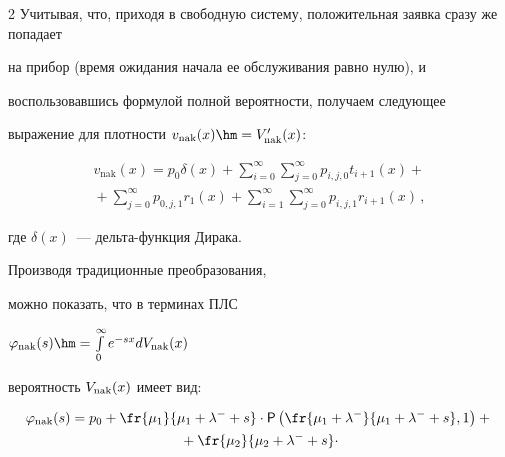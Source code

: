 \begin{multicols}{2}
Учитывая, что, приходя в свободную систему, положительная заявка сразу же попадает


на прибор (время ожидания начала ее обслуживания равно нулю), и


воспользовавшись формулой полной вероятности, получаем следующее


выражение для плот\-ности $v_{\mathrm{nak}}(x)\hm=V'_{\mathrm{nak}}(x)$:




\begin{multline*}


v_{\mathrm{nak}}(x) = p_0 \delta(x)


+ \sum\limits_{i=0}^{\infty} \sum\limits_{j=0}^{\infty}


p_{i,j,0} t_{i+1}(x) +{}\\


{}+ \sum\limits_{j=0}^{\infty}


p_{0,j,1} r_1(x) + \sum\limits_{i=1}^{\infty}


\sum\limits_{j=0}^{\infty} p_{i,j,1} r_{i+1}(x)\,,


\end{multline*}




где $\delta(x)$~--- дель\-та-функ\-ция Дирака.





Производя традиционные преобразования,


можно показать, что в терминах ПЛС


$\varphi_{\mathrm{nak}}(s)\hm=


\int\limits_0^{\infty} e^{-sx} dV_{\mathrm{nak}}(x)$


вероятность $V_{\rm nak}(x)$ имеет вид:




\begin{multline*}


\varphi_{\mathrm{nak}}(s)


= p_0 + \fr{ \mu_1}{\mu_1+\lambda^- + s}


\cdot {\sf P} \left (


\fr{ \mu_1 + \lambda^-}{ \mu_1+\lambda^- + s},1


\right ) +{}\\


{}+


\fr{\mu_2}{\mu_2+\lambda^- + s}


\cdot



\end{multline*}
\end{multicols}
